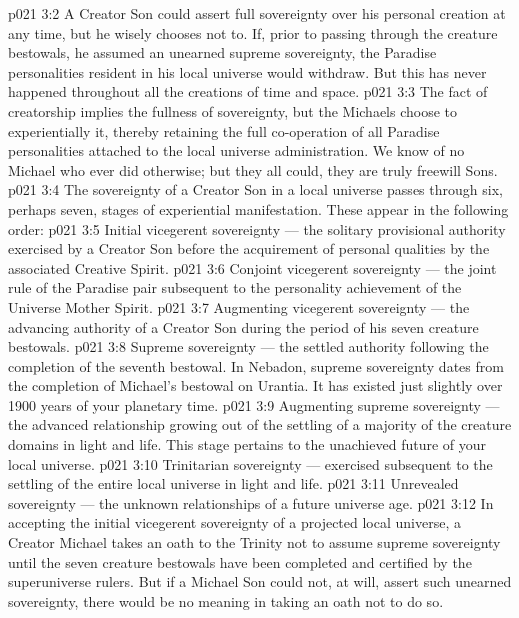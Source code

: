 \vs p021 3:2 \pc A Creator Son could assert full sovereignty over his personal creation at any time, but he wisely chooses not to. If, prior to passing through the creature bestowals, he assumed an unearned supreme sovereignty, the Paradise personalities resident in his local universe would withdraw. But this has never happened throughout all the creations of time and space.
\vs p021 3:3 The fact of creatorship implies the fullness of sovereignty, but the Michaels choose to experientially  it, thereby retaining the full co\hyp{}operation of all Paradise personalities attached to the local universe administration. We know of no Michael who ever did otherwise; but they all could, they are truly freewill Sons.
\vs p021 3:4 \pc The sovereignty of a Creator Son in a local universe passes through six, perhaps seven, stages of experiential manifestation. These appear in the following order:
\vs p021 3:5 \bibnobreakspace Initial vicegerent sovereignty --- the solitary provisional authority exercised by a Creator Son before the acquirement of personal qualities by the associated Creative Spirit.
\vs p021 3:6 \bibnobreakspace Conjoint vicegerent sovereignty --- the joint rule of the Paradise pair subsequent to the personality achievement of the Universe Mother Spirit.
\vs p021 3:7 \bibnobreakspace Augmenting vicegerent sovereignty --- the advancing authority of a Creator Son during the period of his seven creature bestowals.
\vs p021 3:8 \bibnobreakspace Supreme sovereignty --- the settled authority following the completion of the seventh bestowal. In Nebadon, supreme sovereignty dates from the completion of Michael’s bestowal on Urantia. It has existed just slightly over 1900 years of your planetary time.
\vs p021 3:9 \bibnobreakspace Augmenting supreme sovereignty --- the advanced relationship growing out of the settling of a majority of the creature domains in light and life. This stage pertains to the unachieved future of your local universe.
\vs p021 3:10 \bibnobreakspace Trinitarian sovereignty --- exercised subsequent to the settling of the entire local universe in light and life.
\vs p021 3:11 \bibnobreakspace Unrevealed sovereignty --- the unknown relationships of a future universe age.
\vs p021 3:12 \pc In accepting the initial vicegerent sovereignty of a projected local universe, a Creator Michael takes an oath to the Trinity not to assume supreme sovereignty until the seven creature bestowals have been completed and certified by the superuniverse rulers. But if a Michael Son could not, at will, assert such unearned sovereignty, there would be no meaning in taking an oath not to do so.
